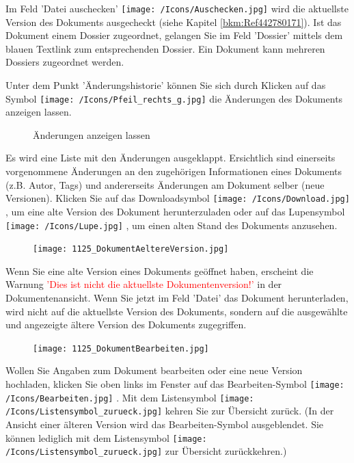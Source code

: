 Im Feld 'Datei auschecken' \texttt{[image: /Icons/Auschecken.jpg]}  wird die aktuellste Version des Dokuments ausgecheckt (siehe Kapitel \ref{bkm:Ref442780171}). Ist das Dokument einem Dossier zugeordnet, gelangen Sie im Feld 'Dossier' mittels dem blauen Textlink  zum entsprechenden Dossier. Ein Dokument kann mehreren Dossiers zugeordnet werden. \newline

\vspace{\baselineskip}

Unter dem Punkt 'Änderungshistorie' können Sie sich durch Klicken auf das Symbol \texttt{[image: /Icons/Pfeil\_rechts\_g.jpg]}  die Änderungen des Dokuments anzeigen lassen.

\begin{figure}[H]
\caption{Änderungen anzeigen lassen}
\end{figure}

Es wird eine Liste mit den Änderungen ausgeklappt. Ersichtlich sind einerseits vorgenommene Änderungen an den zugehörigen Informationen eines Dokuments (z.B. Autor, Tags) und andererseits Änderungen am Dokument selber (neue Versionen). Klicken Sie auf das Downloadsymbol \texttt{[image: /Icons/Download.jpg]} , um eine alte Version des Dokument herunterzuladen oder auf das Lupensymbol \texttt{[image: /Icons/Lupe.jpg]} , um einen alten Stand des Dokuments anzusehen. \newline

\begin{figure}
\vspace{-25pt}
\texttt{[image: 1125\_DokumentAeltereVersion.jpg]}
\end{figure}
Wenn Sie eine alte Version eines Dokuments geöffnet haben, erscheint die Warnung \textcolor{red}{'Dies ist nicht die aktuellste Dokumentenversion!'} in der Dokumentenansicht. Wenn Sie jetzt im Feld 'Datei' das Dokument herunterladen, wird nicht auf die aktuellste Version des Dokuments, sondern auf die ausgewählte und angezeigte ältere Version des Dokuments zugegriffen.

\begin{figure}
\texttt{[image: 1125\_DokumentBearbeiten.jpg]}
\end{figure}
Wollen Sie Angaben zum Dokument bearbeiten oder eine neue Version hochladen, klicken Sie oben links im Fenster auf das Bearbeiten-Symbol \texttt{[image: /Icons/Bearbeiten.jpg]} . Mit dem Listensymbol \texttt{[image: /Icons/Listensymbol\_zurueck.jpg]}  kehren Sie zur Übersicht zurück. (In der Ansicht einer älteren Version wird das Bearbeiten-Symbol ausgeblendet. Sie können lediglich mit dem Listensymbol \texttt{[image: /Icons/Listensymbol\_zurueck.jpg]} zur Übersicht zurückkehren.)

